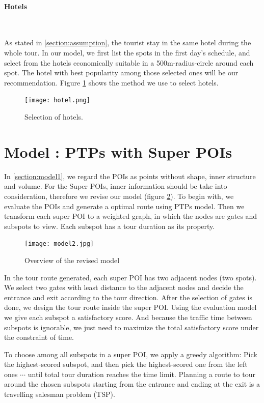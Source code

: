 \documentclass{mcmthesis}
\newcommand{\RNum}[1]{\uppercase\expandafter{\romannumeral #1\relax}}
\begin{document}
  \paragraph{Hotels}\
  
  As stated in \ref{section:assumption}, the tourist stay in the same hotel during the whole tour. In our model, we first list the spots in the first day's schedule, and select from the hotels economically suitable in a 500m-radius-circle around each spot. The hotel with best popularity among those selected ones will be our recommendation. Figure \ref{fig:hotel} shows the method we use to select hotels.
  \begin{figure}[h]
    \centering
    \texttt{[image: hotel.png]}
    \caption{Selection of hotels.}
    \label{fig:hotel}
  \end{figure}

\section{Model \RNum{2}: PTPs with Super POIs} \label{section:model2}
  In \ref{section:model1}, we regard the POIs as points without shape, inner structure and volume. For the Super POIs, inner information should be take into consideration, therefore we revise our model (figure \ref{fig:model2}). To begin with, we evaluate the POIs and generate a optimal route using PTPs model. Then we transform each super POI to a weighted graph, in which the nodes are gates and subspots to view. Each subspot has a tour duration as its property. \par
  \begin{figure}[h]
    \centering
    \texttt{[image: model2.jpg]}
    \caption{Overview of the revised model}
    \label{fig:model2}
  \end{figure}
  In the tour route generated, each super POI has two adjacent nodes (two spots). We select two gates with least distance to the adjacent nodes and decide the entrance and exit according to the tour direction. After the selection of gates is done, we design the tour route inside the super POI. Using the evaluation model we give each subspot a satisfactory score. And because the traffic time between subspots is ignorable, we just need to maximize the total satisfactory score under the constraint of time. \par
  To choose among all subspots in a super POI, we apply a greedy algorithm: Pick the highest-scored subspot, and then pick the highest-scored one from the left ones $\cdots$ until total tour duration reaches the time limit. Planning a route to tour around the chosen subspots starting from the entrance and ending at the exit is a travelling salesman problem (TSP).
\end{document}
